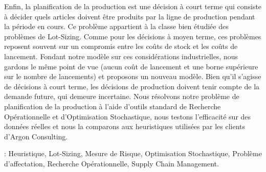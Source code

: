 Enfin, la planification de la production est une décision à court terme qui consiste à décider quels articles doivent être produits par la ligne de production pendant la période en cours.
Ce problème appartient à la classe bien étudiée des problèmes de Lot-Sizing.
Comme pour les décisions à moyen terme, ces problèmes reposent souvent sur un compromis entre les coûts de stock et les coûts de lancement.
Fondant notre modèle sur ces considérations industrielles, nous gardons le même point de vue (aucun coût de lancement et une borne supérieure sur le nombre de lancements) et proposons un nouveau modèle.
Bien qu'il s'agisse de décisions à court terme, les décisions de production doivent tenir compte de la demande future, qui demeure incertaine.
Nous résolvons notre problème de planification de la production à l'aide d'outils standard de Recherche Opérationnelle et d'Optimisation Stochastique, nous testons l'efficacité sur des données réelles et nous la comparons aux heuristiques utilisées par les clients d'Argon Consulting.



 : Heuristique, Lot-Sizing, Mesure de Risque, Optimisation Stochastique, Problème d'affectation, Recherche Opérationnelle, Supply Chain Management.
